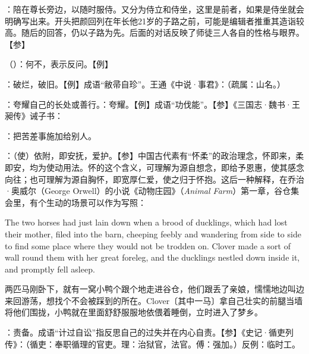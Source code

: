 {
\item {}：陪在尊长旁边，以随时服侍。又分为侍立和侍坐，这里是前者，如果是侍坐就会明确写出来。开头把颜回列在年长他21岁的子路之前，可能是编辑者推重其造诣较高。随后的回答，仍以子路为先。后面的对话反映了师徒三人各自的性格与眼界。【参】
\item {}（）：何不，表示反问。【例】 
\item {}：破烂，破旧。【例】成语“敝帚自珍”。王通《中说·事君》：（疏属：山名。）
\item {}：夸耀自己的长处或善行。：夸耀。【例】成语“功伐能”。【参】《三国志·魏书·王昶传》诫子书：
\item {}：把苦差事施加给别人。
\item {}：（使）依附，即安抚，爱护。【参】中国古代素有“怀柔”的政治理念，怀即来，柔即安，均为使动用法。怀的这个含义，可理解为源自想念，即给予恩惠，使其感念向往；也可理解为源自胸怀，即宽厚仁爱，使之归于怀抱。这后一种解释，在乔治·奥威尔（George Orwell）的小说《动物庄园》（\emph{Animal Farm}）第一章，谷仓集会里，有个生动的场景可以作为写照：
\begin{lyquotepara}
The two horses had just lain down when a brood of ducklings, which had lost their mother, filed into the barn, cheeping feebly and wandering from side to side to find some place where they would not be trodden on. Clover made a sort of wall round them with her great foreleg, and the ducklings nestled down inside it, and promptly fell asleep.

两匹马刚卧下，就有一窝小鸭个跟个地走进谷仓，他们跟丢了亲娘，懦懦地边叫边来回游荡，想找个不会被踩到的所在。Clover〔其中一马〕拿自己壮实的前腿当墙将他们围拢，小鸭就在里面舒舒服服地依偎着睡倒，立时进入了梦乡。
\end{lyquotepara}
}
{}


{
\item {}：责备。成语“计过自讼”指反思自己的过失并在内心自责。【参】《史记·循吏列传》：（循吏：奉职循理的官吏。理：治狱官，法官。傅：强加。）反例：临时工。
}
{}


